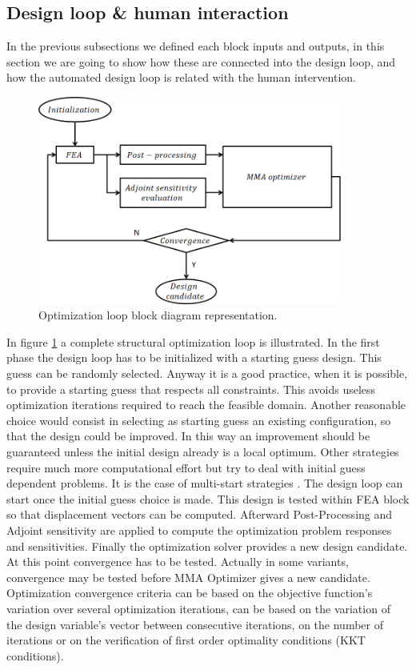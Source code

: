 \subsection{Design loop \& human interaction} 
In the previous subsections we defined each block inputs and outputs, in this section we are going to show how these are connected into the design loop, and how the automated design loop is related with the human intervention.
\begin{figure}[ht]
\centering
\includegraphics[width=10cm]{images/Ch2/optimization_loop}
\caption{Optimization loop block diagram representation.}
\label{fig.2.7}
\end{figure}
In figure \ref{fig.2.7} a complete structural optimization loop is illustrated. In the first phase the design loop has to be initialized with a starting guess design. This guess can be randomly selected. Anyway it is a good practice, when it is possible, to provide a starting guess that respects all constraints. This avoids useless optimization iterations required to reach the feasible domain. Another reasonable choice would consist in selecting as starting guess an existing configuration, so that the design could be improved. In this way an improvement should be guaranteed unless the initial design already is a local optimum. Other strategies require much more computational effort but try to deal with initial guess dependent problems. It is the case of multi-start strategies \cite{dixon1975towards}. The design loop can start once the initial guess choice is made. This design is tested within FEA block so that displacement vectors can be computed. Afterward Post-Processing and Adjoint sensitivity are applied to compute the optimization problem responses and sensitivities. Finally the optimization solver provides a new design candidate. At this point convergence has to be tested. Actually in some variants, convergence may be tested before MMA Optimizer gives a new candidate. Optimization convergence criteria can be based on the objective function's variation over several optimization iterations, can be based on the variation of the design variable's vector between consecutive iterations, on the number of iterations or on the verification of first order optimality conditions (KKT conditions).
